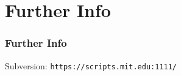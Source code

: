 \section{Further Info}
\begin{frame}
  \frametitle{Further Info}
  Subversion: {\tt https://scripts.mit.edu:1111/}
\end{frame}
